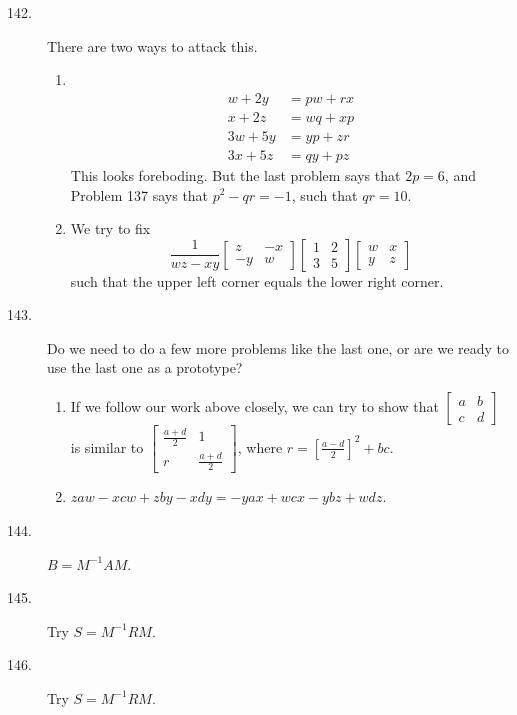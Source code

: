 \documentclass{article}
\begin{document}
\begin{description}
  \item[142.] There are two ways to attack this.
    \begin{enumerate}[\hspace{1cm}(I)]
      \item $\ $
        \begin{align*} 
           w + 2y & = pw + rx \\
           x + 2z & = wq + xp \\
          3w + 5y & = yp + zr \\
          3x + 5z & = qy + pz
        \end{align*}
        This looks foreboding. But the last problem says that $2p = 6$, and Problem 137 says that $p^2 - qr = -1$, such that $qr = 10$.
      \item We try to fix
        \begin{equation*}
          \frac{1}{wz-xy}
          \begin{bmatrix} z & -x \\ -y & w \end{bmatrix}
          \begin{bmatrix} 1 & 2 \\ 3 & 5 \end{bmatrix}
          \begin{bmatrix} w & x \\ y & z \end{bmatrix}
        \end{equation*}
        such that the upper left corner equals the lower right corner.
    \end{enumerate}

  \item[143.] Do we need to do a few more problems like the last one, or are we ready to use the last one as a prototype?
    \begin{enumerate}[\hspace{1cm}(I)]
      \item If we follow our work above closely, we can try to show that $\begin{bmatrix} a & b \\ c & d \end{bmatrix}$ is similar to $\begin{bmatrix} \frac{a+d}{2} & 1 \\ r & \frac{a+d}{2} \end{bmatrix}$, where $r = \left[ \frac{a-d}{2} \right] ^2 + bc$.
      \item $zaw - xcw + zby - xdy = -yax + wcx - ybz + wdz$.
    \end{enumerate}

  \item[144.] $B = M^{-1} AM$.

  \item[145.] Try $S = M^{-1} RM$.

  \item[146.] Try $S = M^{-1} RM$.

\end{description}
\end{document}
